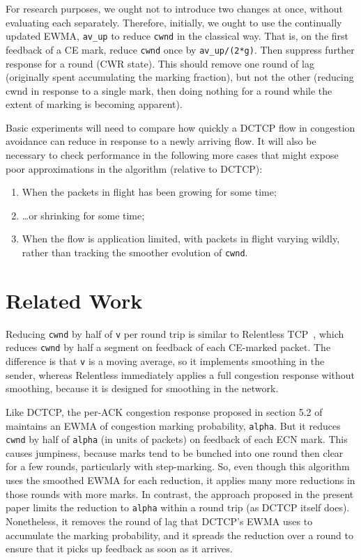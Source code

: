 For research purposes, we ought not to introduce two changes at once, without evaluating each separately. Therefore, initially, we ought to use the continually updated EWMA, \texttt{av\_up} to reduce \texttt{cwnd} in the classical way. That is, on the first feedback of a CE mark, reduce \texttt{cwnd} once by \texttt{av\_up/(2*g)}. Then suppress further response for a round (CWR state). This should remove one round of lag (originally spent accumulating the marking fraction), but not the other (reducing cwnd in response to a single mark, then doing nothing for a round while the extent of marking is becoming apparent).

Basic experiments will need to compare how quickly a DCTCP flow in congestion avoidance can reduce in response to a newly arriving flow. It will also be necessary to check performance in the following more cases that might expose poor approximations in the algorithm (relative to DCTCP):
\begin{enumerate}
	\item When the packets in flight has been growing for some time;
	\item \ldots{}or shrinking for some time;
	\item When the flow is application limited, with packets in flight varying wildly, rather than tracking the smoother evolution of \texttt{cwnd}.
\end{enumerate}

\section{Related Work}\label{prresp_related}

Reducing \texttt{cwnd} by half of \texttt{v} per round trip is similar to Relentless TCP~\cite{Mathis09:Relentless}, which reduces \texttt{cwnd} by half a segment on feedback of each CE-marked packet. The difference is that \texttt{v} is a moving average, so it implements smoothing in the sender, whereas Relentless immediately applies a full congestion response without smoothing, because it is designed for smoothing in the network.

Like DCTCP, the per-ACK congestion response proposed in section 5.2 of \cite{Alizadeh11:DCTCP_Analysis} maintains an EWMA of congestion marking probability, \texttt{alpha}. But it reduces \texttt{cwnd} by half of \texttt{alpha} (in units of packets) on feedback of each ECN mark. This causes jumpiness, because marks tend to be bunched into one round then clear for a few rounds, particularly with step-marking. So, even though this algorithm uses the smoothed EWMA for each reduction, it applies many more reductions in those rounds with more marks. In contrast, the approach proposed in the present paper limits the reduction to \texttt{alpha} within a round trip (as DCTCP itself does). Nonetheless, it removes the round of lag that DCTCP's EWMA uses to accumulate the marking probability, and it spreads the reduction over a round to ensure that it picks up feedback as soon as it arrives.

